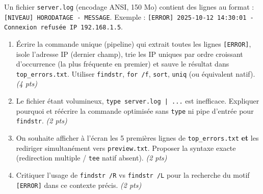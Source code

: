 \documentclass[11pt]{article}
\begin{document}
\begin{exercice}
Un fichier \texttt{server.log} (encodage ANSI, 150 Mo) contient des lignes au format : \texttt{[NIVEAU] HORODATAGE - MESSAGE}. Exemple : \texttt{[ERROR] 2025-10-12 14:30:01 - Connexion refusée IP 192.168.1.5}.
\begin{enumerate}
    \item Écrire la commande unique (pipeline) qui extrait toutes les lignes \texttt{[ERROR]}, isole l'adresse IP (dernier champ), trie les IP uniques par ordre croissant d'occurrence (la plus fréquente en premier) et sauve le résultat dans \texttt{top\_errors.txt}. Utiliser \texttt{findstr}, \texttt{for /f}, \texttt{sort}, \texttt{uniq} (ou équivalent natif). \textit{(4 pts)}
    \item Le fichier étant volumineux, \texttt{type server.log | ...} est inefficace. Expliquer pourquoi et réécrire la commande optimisée sans \texttt{type} ni pipe d'entrée pour \texttt{findstr}. \textit{(2 pts)}
    \item On souhaite afficher à l'écran les 5 premières lignes de \texttt{top\_errors.txt} \textbf{et} les rediriger simultanément vers \texttt{preview.txt}. Proposer la syntaxe exacte (redirection multiple / \texttt{tee} natif absent). \textit{(2 pts)}
    \item Critiquer l'usage de \texttt{findstr /R} vs \texttt{findstr /L} pour la recherche du motif \texttt{[ERROR]} dans ce contexte précis. \textit{(2 pts)}
\end{enumerate}
\end{exercice}
\end{document}
